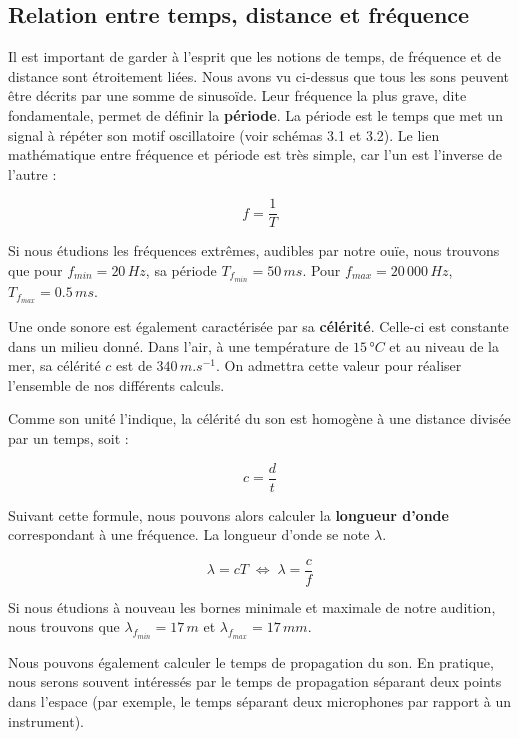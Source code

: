 \documentclass[
]{book}
\begin{document}
\hypertarget{relation-entre-temps-distance-et-fruxe9quence}{%
\subsection{Relation entre temps, distance et fréquence}\label{relation-entre-temps-distance-et-fruxe9quence}}

Il est important de garder à l'esprit que les notions de temps, de fréquence et de distance sont étroitement liées. Nous avons vu ci-dessus que tous les sons peuvent être décrits par une somme de sinusoïde. Leur fréquence la plus grave, dite fondamentale, permet de définir la \textbf{période}. La période est le temps que met un signal à répéter son motif oscillatoire (voir schémas 3.1 et 3.2). Le lien mathématique entre fréquence et période est très simple, car l'un est l'inverse de l'autre :

\[ f = \frac 1 T \]

Si nous étudions les fréquences extrêmes, audibles par notre ouïe, nous trouvons que pour \(f_{min} = 20 \,Hz\), sa période \(T_{f_{min}} = 50 \,ms\). Pour \(f_{max} = 20\,000 \,Hz\), \(T_{f_{max}} = 0.5 \,ms\).

Une onde sonore est également caractérisée par sa \textbf{célérité}. Celle-ci est constante dans un milieu donné. Dans l'air, à une température de \(15 \,°C\) et au niveau de la mer, sa célérité \(c\) est de \(340\,m.s^{-1}\). On admettra cette valeur pour réaliser l'ensemble de nos différents calculs.

Comme son unité l'indique, la célérité du son est homogène à une distance divisée par un temps, soit :

\[ c =\frac d t \]

Suivant cette formule, nous pouvons alors calculer la \textbf{longueur d'onde} correspondant à une fréquence. La longueur d'onde se note \(\lambda\).

\[ \lambda = cT \; \iff \; \lambda = \frac c f\]

Si nous étudions à nouveau les bornes minimale et maximale de notre audition, nous trouvons que \(\lambda_{f_{min}} = 17 \,m\) et \(\lambda_{f_{max}} = 17 \,mm\).

Nous pouvons également calculer le temps de propagation du son. En pratique, nous serons souvent intéressés par le temps de propagation séparant deux points dans l'espace (par exemple, le temps séparant deux microphones par rapport à un instrument).
\end{document}
